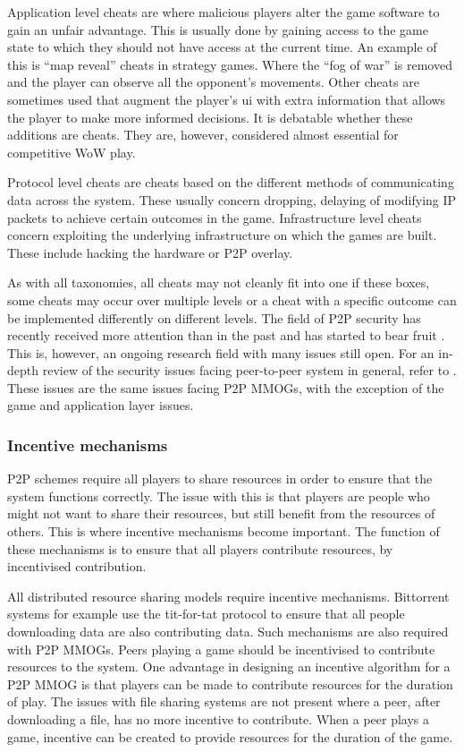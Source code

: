 \documentclass[10pt,a4paper,journal,cspaper,compsoc]{IEEEtran}
\begin{document}
Application level cheats are where malicious players alter the game software to gain an unfair advantage. This is usually done by gaining access to
the game state to which they should not have access at the current time. An example of this is ``map reveal'' cheats in strategy games. Where the
``fog of war'' is removed and the player can observe all the opponent's movements. Other cheats are sometimes used that augment the player's \ac{ui}
with extra information that allows the player to make more informed decisions. It is debatable whether these additions are cheats. They are, however,
considered almost essential for competitive \ac{WoW} play.

Protocol level cheats are cheats based on the different methods of communicating data across the system. These usually concern dropping, delaying of
modifying IP packets to achieve certain outcomes in the game. Infrastructure level cheats concern exploiting the underlying infrastructure on which
the games are built. These include hacking the hardware or P2P overlay.

As with all taxonomies, all cheats may not cleanly fit into one if these boxes, some cheats may occur over multiple levels or a cheat with a specific
outcome can be implemented differently on different levels. The field of P2P security has recently received more attention than in the past and has
started to bear fruit \cite{survey_p2p_game_cheats}. This is, however, an ongoing research field with many issues still open. For an in-depth review
of the security issues facing peer-to-peer system in general, refer to \cite{p2p_security_issues}. These issues are the same issues facing P2P MMOGs,
with the exception of the game and application layer issues.

\subsubsection{Incentive mechanisms}

P2P schemes require all players to share resources in order to ensure that the system functions correctly. The issue with this is that players are
people who might not want to share their resources, but still benefit from the resources of others. This is where incentive mechanisms become
important. The function of these mechanisms is to ensure that all players contribute resources, by incentivised contribution.

All distributed resource sharing models require incentive mechanisms. Bittorrent systems for example use the tit-for-tat protocol \cite{tit_for_tat}
to ensure that all people downloading data are also contributing data. Such mechanisms are also required with P2P MMOGs. Peers playing a game should
be incentivised to contribute resources to the system. One advantage in designing an incentive algorithm for a P2P MMOG is that players can be made
to contribute resources for the duration of play. The issues with file sharing systems are not present where a peer, after downloading a file, has no
more incentive to contribute. When a peer plays a game, incentive can be created to provide resources for the duration of the game.
\end{document}
